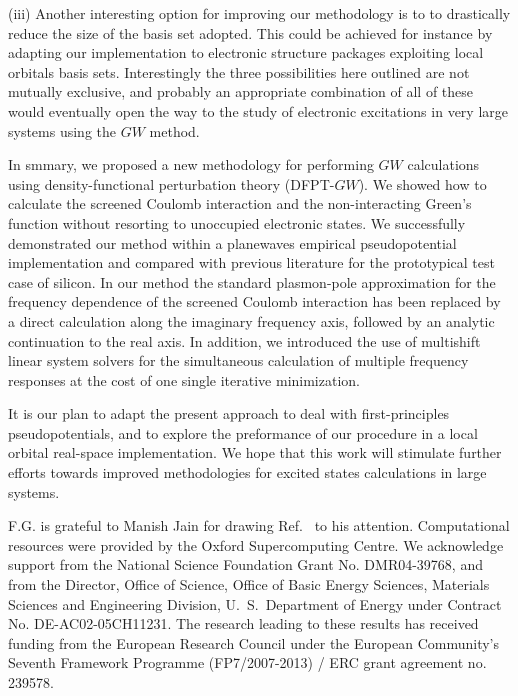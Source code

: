 \documentclass[twocolumn,prb,showpacs,superscriptaddress]{revtex4}
\begin{document}
(iii) Another interesting option for improving our methodology is to
to drastically reduce the size of the basis set adopted. This could be achieved
for instance by adapting our implementation to electronic structure packages
exploiting local orbitals basis sets.\cite{siesta}
Interestingly the three possibilities here outlined are not mutually exclusive,
and probably an appropriate combination of all of these would eventually open
the way to the study of electronic excitations in
very large systems using the $GW$ method.

In smmary, we proposed a new methodology for performing $GW$ calculations
using density-functional perturbation theory (DFPT-$GW$). We showed how
to calculate the screened Coulomb interaction and the non-interacting
Green's function without resorting to unoccupied electronic states.
We successfully demonstrated our method within a planewaves empirical
pseudopotential implementation and compared with previous literature for the
prototypical test case of silicon. In our method the standard plasmon-pole
approximation for the frequency dependence of the screened Coulomb interaction
has been replaced by a direct calculation along the imaginary frequency axis,
followed by an analytic continuation to the real axis.
In addition, we introduced the use of multishift linear system solvers for the simultaneous
calculation of multiple frequency responses at the cost of one single
iterative minimization.

It is our plan to adapt the present approach to deal with first-principles
pseudopotentials, and to explore the preformance of our procedure in a local
orbital real-space implementation. We hope that this work will stimulate further efforts
towards improved methodologies for excited states calculations in large systems.

\begin{acknowledgments}
F.G. is grateful to Manish Jain for drawing Ref.\  to his attention.
Computational resources were provided by the Oxford Supercomputing Centre.
We acknowledge support from the National Science Foundation Grant No. DMR04-39768, and from
the Director, Office of Science, Office of Basic Energy Sciences, Materials Sciences
and Engineering Division, U.\ S.\ Department of Energy under Contract No. DE-AC02-05CH11231.
The research leading to these results has received funding from the European Research
Council under the European Community's Seventh Framework Programme (FP7/2007-2013) / ERC 
grant agreement no. 239578.

\end{acknowledgments}
\end{document}
